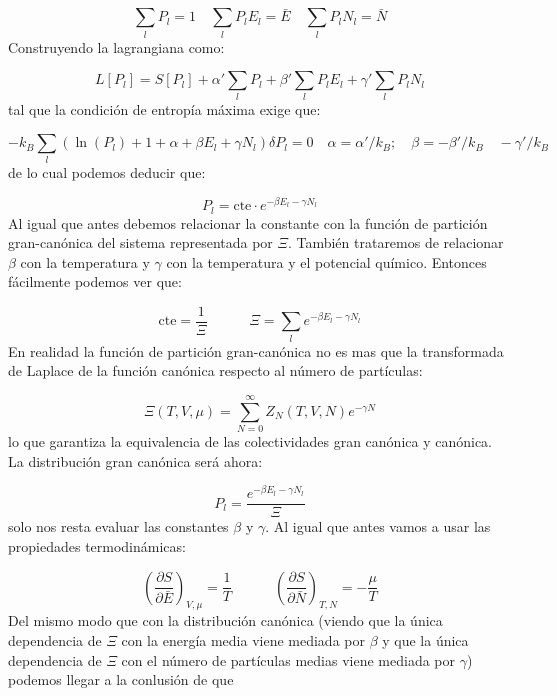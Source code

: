 \documentclass[12pt,a4paper]{article}
\numberwithin{equation}{section}
\numberwithin{figure}{section}
\newcommand{\tquad}{\quad \quad \quad}
\newcommand{\parentesis}[1]{\left( #1  \right)}
\newcommand{\parciales}[2]{\frac{\partial #1}{\partial #2}}
\newcommand{\cte}{\mathrm{cte}}
\theoremstyle{definition}
\begin{document}
\begin{equation}
\sum_l P_l = 1 \quad \sum_l P_l E_l = \bar{E} \quad \sum_l P_l N_l = \bar{N}
\end{equation}
Construyendo la lagrangiana como:

\begin{equation}
L[P_l] = S[P_l] + \alpha' \sum_l P_l + \beta ' \sum_l P_l E_l +
 \gamma ' \sum_l P_l N_l
\end{equation}
tal que la condición de entropía máxima exige que:

\begin{equation}
- k_B \sum_l \parentesis{\ln (P_l) + 1 + \alpha + \beta E_l + \gamma N_l} \delta P_l=0 \quad \alpha = \alpha'/k_B; \quad \beta = -\beta'/k_B \quad - \gamma' / k_B
\end{equation}
de lo cual podemos deducir que:

\begin{equation}
P_l = \cte \cdot e^{-\beta E_l - \gamma N_l}
\end{equation}
Al igual que antes debemos relacionar la constante con la función de partición gran-canónica del sistema representada por $\Xi$. También trataremos de relacionar $\beta$ con la temperatura y $\gamma$ con la temperatura y el potencial químico. Entonces fácilmente podemos ver que:

\begin{equation}
\cte = \frac{1}{\Xi} \tquad \Xi = \sum_l e^{- \beta E_l - \gamma N_l}
\end{equation}
En realidad la función de partición gran-canónica no es mas que la transformada de Laplace de la función canónica respecto al número de partículas:

\begin{equation}
\Xi (T,V,\mu) = \sum_{N=0}^\infty Z_N (T,V,N) e^{- \gamma N}
\end{equation}
lo que garantiza la equivalencia de las colectividades gran canónica y canónica. La distribución gran canónica será ahora:

\begin{equation}
P_l = \frac{e^{-\beta E_l - \gamma N_l}}{\Xi}
\end{equation}
solo nos resta evaluar las constantes $\beta$ y $\gamma$. Al igual que antes vamos a usar las propiedades termodinámicas:

\begin{equation}
\parentesis{\parciales{S}{\bar{E}}}_{V,\mu} = \frac{1}{T} \tquad 
\parentesis{\parciales{S}{\bar{N}}}_{T,N} = - \frac{\mu}{T}
\end{equation}
Del mismo modo que con la distribución canónica (viendo que la única dependencia de $\Xi$ con la energía media viene mediada por $\beta$ y que la única dependencia de $\Xi$ con el número de partículas medias viene mediada por $\gamma$) podemos llegar a la conlusión de que
\end{document}
